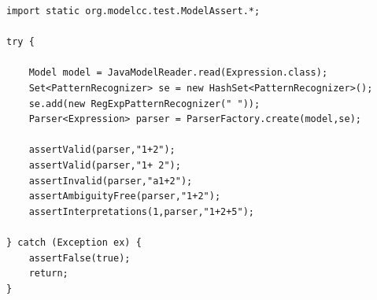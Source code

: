 \documentclass[a4paper,twoside,onecolumn]{article}
\newcommand{\pb}{\newpage}
\newcommand{\empt}{\pb \thispagestyle{empty} \rule[0mm]{0mm}{0mm} \pb}
\begin{document}
\begin{verbatim}
import static org.modelcc.test.ModelAssert.*;

try {

    Model model = JavaModelReader.read(Expression.class);
    Set<PatternRecognizer> se = new HashSet<PatternRecognizer>();
    se.add(new RegExpPatternRecognizer(" "));
    Parser<Expression> parser = ParserFactory.create(model,se);

    assertValid(parser,"1+2");
    assertValid(parser,"1+ 2");
    assertInvalid(parser,"a1+2");
    assertAmbiguityFree(parser,"1+2");
    assertInterpretations(1,parser,"1+2+5");

} catch (Exception ex) {
    assertFalse(true);
    return;
}
\end{verbatim}

%
%

\end{document}
